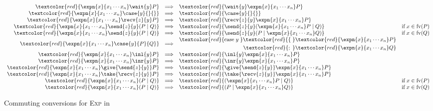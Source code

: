 \begin{figure*}
  \centering
  \(
    \begin{array}{rclr}
      \textcolor{red}{ \expn{x}{x_1 \cdots x_n}\wait{y}P }
      &\Longrightarrow&
      \textcolor{red}{ \wait{y}\expn{x}{x_1 \cdots x_n}P }
      \\
      \textcolor{red}{ \expn{x}{x_1\cdots x_n}\case{y}{}{} }
      &\Longrightarrow&
      \textcolor{red}{ \case{y}{}{} }
      \\
      \textcolor{red}{ \expn{x}{x_1 \cdots x_n}\recv{z}{y}P }
      &\Longrightarrow&
      \textcolor{red}{ \recv{z}{y}\expn{x}{x_1 \cdots x_n}P }
      \\
      \textcolor{red}{ \expn{x}{x_1 \cdots x_n}\send{z}{y}(P \mid Q) }
      &\Longrightarrow&
      \textcolor{red}{ \send{z}{y}(\expn{x}{x_1 \cdots x_n}P \mid Q) }
      &\text{if} \; x \in \text{fv}(P)
      \\
      \textcolor{red}{ \expn{x}{x_1 \cdots x_n}\send{z}{y}(P \mid Q) }
      &\Longrightarrow&
      \textcolor{red}{ \send{z}{y}(P \mid \expn{x}{x_1 \cdots x_n}Q) }
      &\text{if} \; x \in \text{fv}(Q) 
      \\
      \textcolor{red}{ \expn{x}{x_1 \cdots x_n}\case{y}{P}{Q} }
      &\Longrightarrow&
      \begin{aligned}
        \textcolor{red}{ \text{case}\;y\;}
        \textcolor{red}{ \{\;}& \textcolor{red}{\expn{x}{x_1 \cdots x_n}P}\\
        \textcolor{red}{  ;\;}& \textcolor{red}{\expn{x}{x_1 \cdots x_n}Q}
      \end{aligned}
      \\
      \textcolor{red}{ \expn{x}{x_1 \cdots x_n}\inl{y}P }
      &\Longrightarrow&
      \textcolor{red}{ \inl{y}\expn{x}{x_1 \cdots x_n}P }
      \\
      \textcolor{red}{ \expn{x}{x_1 \cdots x_n}\inr{y}P }
      &\Longrightarrow&
      \textcolor{red}{ \inr{y}\expn{x}{x_1 \cdots x_n}P }
      \\
      \textcolor{red}{ \expn{x}{x_1 \cdots x_n}\give{\send{z}{y}}P }
      &\Longrightarrow&
      \textcolor{red}{ \give{\send{z}{y}}\expn{x}{x_1 \cdots x_n}P }
      \\
      \textcolor{red}{ \expn{x}{x_1 \cdots x_n}\take{\recv{z}{y}}P }
      &\Longrightarrow&
      \textcolor{red}{ \take{\recv{z}{y}}\expn{x}{x_1 \cdots x_n}P }
      \\
      \textcolor{red}{ \expn{x}{x_1 \cdots x_n}(P \mid Q) }
      &\Longrightarrow&
      \textcolor{red}{ (\expn{x}{x_1 \cdots x_n}P \mid Q) }
      &\text{if} \; x \in \text{fv}(P) 
      \\
      \textcolor{red}{ \expn{x}{x_1 \cdots x_n}(P \mid Q) }
      &\Longrightarrow&
      \textcolor{red}{ (P \mid \expn{x}{x_1 \cdots x_n}Q) }
      &\text{if} \; x \in \text{fv}(Q) 
    \end{array}
  \)
  \caption{Commuting conversions for \textsc{Exp} in \nodcap}
  \label{fig:nodcap-expn-cc}
\end{figure*}

